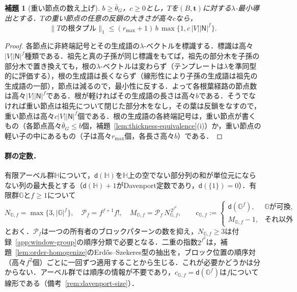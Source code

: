 \documentclass[11pt,a4paper]{ltjsarticle}
\numberwithin{equation}{section}
\theoremstyle{plain}
\newtheorem{lemma}[theorem]{補題}
\theoremstyle{definition}
\theoremstyle{remark}
\begin{document}
\begin{lemma}[重い節点の数え上げ]
\label{lem:heavy-node-count}
$b\ge\bar\theta_G$，$c\ge0$とし，$T$を$(B,\mathbf t)$に対する$\lambda$-最小導出とする．$T$の重い節点の任意の反鎖の大きさが高々$c$なら，
\[
 \|T\text{の根タプル}\|_1\le(r_{\max}+1)\,b\,\max\{1,c\,|V||\mathsf N|^f\}.
\]
\end{lemma}

\begin{proof}
各節点に非終端記号とその生成語の$\lambda$-ベクトルを標識する．標識は高々$|V||\mathsf N|^f$種類である．祖先と真の子孫が同じ標識をもてば，祖先の部分木を子孫の部分木で置き換えても，根の$\lambda$-ベクトルは変わらず（テンプレートは$\lambda$を準同型的に評価する），根の生成語は長くならず（線形性により子孫の生成語は祖先の生成語の一部），節点は減るので，最小性に反する．よって各根葉経路の節点数は高々$|V||\mathsf N|^f$である．根が軽ければその生成語の長さは高々$b$である．そうでなければ重い節点は祖先について閉じた部分木をなし，その葉は反鎖をなすので，重い節点は高々$c|V||\mathsf N|^f$個である．根の生成語の各終端記号は，重い節点が書くもの（各節点高々$\bar\theta_G\le b$個，補題~\ref{lem:thickness-equivalence}(i)）か，重い節点の軽い子の中にあるもの（子は高々$r_{\max}$個，各長さ高々$b$）である．
\end{proof}

\paragraph{群の定数．}
有限アーベル群${\mathbb H}$について，$\mathsf d({\mathbb H})$を${\mathbb H}$上の空でない部分列の和が単位元にならない列の最大長とする（$\mathsf d({\mathbb H})+1$がDavenport定数であり，$\mathsf d(\{1\})=0$）．有限群${\mathbb G}$と$f\ge1$について
\[
 N_{{\mathbb G},f}=\max\{3,|{\mathbb G}|^f\},\quad
 \mathcal P_f=f^{f+1}f!,\quad
 M_{{\mathbb G},f}=\mathcal P_f\,N_{{\mathbb G},f}^{\,2^{f^2}},
 \qquad
 c_{{\mathbb G},f}:=
 \begin{cases}
 \mathsf d({\mathbb G}^f),&{\mathbb G}\text{が可換},\\
 M_{{\mathbb G},f}-1,&\text{それ以外}
 \end{cases}
\]
とおく．$\mathcal P_f$は一つの所有者のブロックパターンの数を抑え，$N_{{\mathbb G},f}\ge3$は付録~\ref{app:window-group}の順序分類で必要となる．二重の指数$2^{f^2}$は，補題~\ref{lem:order-homogenize}のErd\H{o}s--Szekeres型の抽出を，ブロック位置の順序対（高々$f^2$個）ごとに一回ずつ適用することから生じる．これが必要かどうかは分からない．アーベル群では順序の情報が不要であり，$c_{{\mathbb G},f}=\mathsf d({\mathbb G}^f)$は$f$について線形である（備考~\ref{rem:davenport-size}）．
\end{document}
